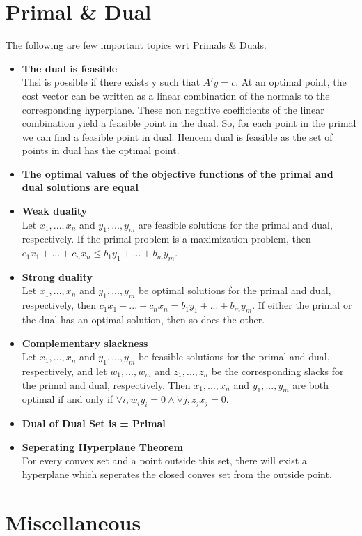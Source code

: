 \documentclass[a4paper,12pt]{report}
\begin{document}
\section{Primal \& Dual}
The following are few important topics wrt Primals \& Duals.
\begin{itemize}
\item \textbf{The dual is feasible}\\
Thsi is possible if there exists y such that $A'y = c$.
At an optimal point, the cost vector can be written as a linear combination of the normals to the corresponding hyperplane. These non negative coefficients of the linear combination yield a feasible point in the dual. So, for each point in the primal we can find a feasible point in dual. Hencem dual is feasible as the set of points in dual has the optimal point.
\item \textbf{The optimal values of the objective functions of the primal and dual solutions
are equal}
\item \textbf{Weak duality}\\
Let $x_1, . . . , x_n$ and $y_1, . . . , y_m$ are feasible solutions for the primal and dual, respectively. If the primal problem is a maximization problem, then $c_1x_1 + . . . + c_nx_n \leq b_1y_1 + . . . + b_my_m$.
\item \textbf{Strong duality}\\
Let $x_1, . . . , x_n$ and $y_1, . . . , y_m$ be optimal solutions for the primal and dual, respectively, then $c_1x_1 + . . . + c_nx_n = b_1y_1 + . . . + b_my_m$. If either the primal or the dual has an optimal solution, then so does the other.
\item \textbf{Complementary slackness}\\
Let $x_1, . . . , x_n$ and $y_1, . . . , y_m$ be feasible solutions for the primal and dual, respectively, and let $w_1, . . . , w_m$ and $z_1, . . . , z_n$ be the corresponding slacks for the primal and dual, respectively. Then $x_1, . . . , x_n$ and $y_1, . . . , y_m$ are both optimal if and only if $ \forall i, w_iy_i = 0 \land \forall j, z_jx_j = 0$.
\item \textbf{Dual of Dual Set is = Primal}
\item \textbf{Seperating Hyperplane Theorem}\\
For every convex set and a point outside this set, there will exist a hyperplane which seperates the closed conves set from the outside point.
\end{itemize}
\section{Miscellaneous}
\end{document}
